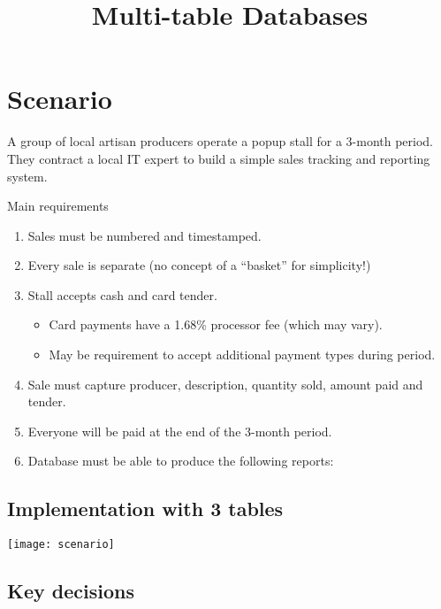 \documentclass[slides]{pgnotes}
\title{Multi-table Databases}
\begin{document}
\maketitle

\tableofcontents


\section{Scenario}

A group of local artisan producers operate a popup stall for a 3-month period.
They contract a local IT expert to build a simple sales tracking and reporting system.

\begin{bluebox}{Main requirements}
  \begin{enumerate}
  \item Sales must be numbered and timestamped.
  \item Every sale is separate (no concept of a ``basket'' for simplicity!)
  \item Stall accepts cash and card tender.
    \begin{itemize}
    \item Card payments have a 1.68\% processor fee (which may vary).
    \item May be requirement to accept additional payment types during period.
    \end{itemize}
  \item Sale must capture producer, description, quantity sold, amount paid and tender.
  \item Everyone will be paid at the end of the 3-month period.
  \item Database must be able to produce the following reports:
  \end{enumerate}
\end{bluebox}


\subsection{Implementation with 3 tables}

\begin{center}
\texttt{[image: scenario]}
\end{center}

\subsection{Key decisions}
\end{document}
